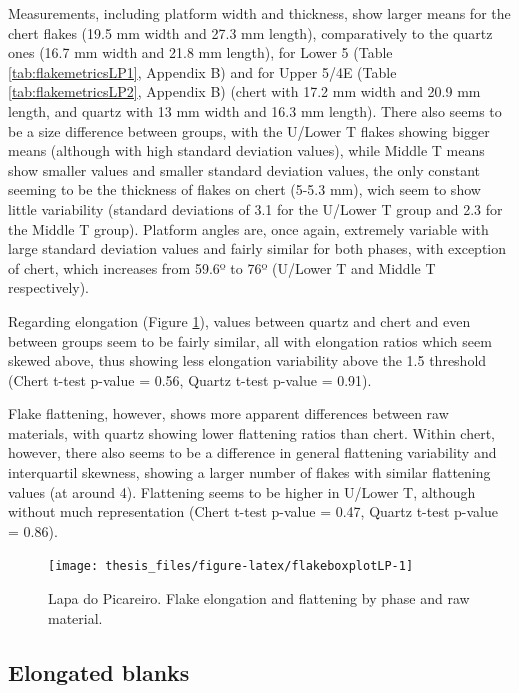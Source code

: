 \documentclass[12pt,twoside]{reedthesis}
\begin{document}
Measurements, including platform width and thickness, show larger means for the chert flakes (19.5 mm width and 27.3 mm length), comparatively to the quartz ones (16.7 mm width and 21.8 mm length), for Lower 5 (Table \ref{tab:flakemetricsLP1}, Appendix B) and for Upper 5/4E (Table \ref{tab:flakemetricsLP2}, Appendix B) (chert with 17.2 mm width and 20.9 mm length, and quartz with 13 mm width and 16.3 mm length). There also seems to be a size difference between groups, with the U/Lower T flakes showing bigger means (although with high standard deviation values), while Middle T means show smaller values and smaller standard deviation values, the only constant seeming to be the thickness of flakes on chert (5-5.3 mm), wich seem to show little variability (standard deviations of 3.1 for the U/Lower T group and 2.3 for the Middle T group). Platform angles are, once again, extremely variable with large standard deviation values and fairly similar for both phases, with exception of chert, which increases from 59.6º to 76º (U/Lower T and Middle T respectively).

Regarding elongation (Figure \ref{fig:flakeboxplotLP}), values between quartz and chert and even between groups seem to be fairly similar, all with elongation ratios which seem skewed above, thus showing less elongation variability above the 1.5 threshold (Chert t-test p-value = 0.56, Quartz t-test p-value = 0.91).

Flake flattening, however, shows more apparent differences between raw materials, with quartz showing lower flattening ratios than chert. Within chert, however, there also seems to be a difference in general flattening variability and interquartil skewness, showing a larger number of flakes with similar flattening values (at around 4). Flattening seems to be higher in U/Lower T, although without much representation (Chert t-test p-value = 0.47, Quartz t-test p-value = 0.86).
\begin{figure}

{\centering \texttt{[image: thesis\_files/figure-latex/flakeboxplotLP-1]} 

}

\caption{Lapa do Picareiro. Flake elongation and flattening by phase and raw material.}\label{fig:flakeboxplotLP}
\end{figure}
\hypertarget{elongated-blanks}{%
\subsection{Elongated blanks}\label{elongated-blanks}}
\end{document}
